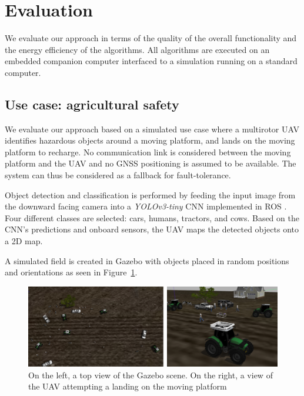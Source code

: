 \documentclass[conference, onecolumn, draftclsnofoot]{IEEEtran}
\begin{document}
\section{Evaluation}
\label{sec:experimental}

We evaluate our approach in terms of the quality of the overall
functionality and the energy efficiency of the algorithms. All
algorithms are executed on an embedded companion computer interfaced
to a simulation running on a standard computer.

\subsection{Use case: agricultural safety}

We evaluate our approach based on a simulated use case where %
a multirotor UAV identifies
hazardous objects around a moving platform, and lands on the
moving platform to recharge.
%
%
No communication link is considered between the moving platform and the UAV
and no GNSS positioning is assumed to be available. The system can thus be
considered as a fallback for fault-tolerance.


Object detection and classification is performed by feeding the input
image from the downward facing camera into a \emph{YOLOv3-tiny} CNN
\cite{yolov3} implemented in ROS \cite{bjelonicYolo2018}. Four
different classes are selected: cars, humans, tractors, and
cows. Based on the CNN's predictions and onboard
sensors, the UAV maps the detected objects onto a 2D map.
 

A simulated field is created in Gazebo with objects placed in random
positions and orientations as seen in Figure~\ref{fig:Gazebo}.

\begin{figure}[t]
\centering
\includegraphics[scale=0.2]{gazebo_scalled.png}
\caption{On the left, a top view of the Gazebo scene. 
On the right, a view of the UAV attempting a landing on the moving platform }
\label{fig:Gazebo}
\end{figure}
\end{document}
